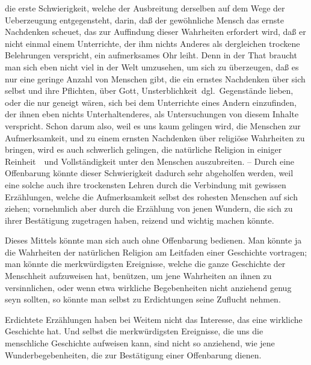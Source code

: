 \begin{aufza}
\item die erste Schwierigkeit, welche der Ausbreitung derselben auf dem Wege der Ueberzeugung entgegensteht, darin, daß der gewöhnliche Mensch das ernste Nachdenken scheuet, das zur Auffindung dieser Wahrheiten erfordert wird, daß er nicht einmal einem Unterrichte, der ihm nichts Anderes als dergleichen trockene Belehrungen verspricht, ein aufmerksames Ohr leiht. Denn in der That braucht man sich eben nicht viel in der Welt umzusehen, um sich zu überzeugen, daß es nur eine geringe Anzahl von Menschen gibt, die ein ernstes Nachdenken über sich selbst und ihre Pflichten, über Gott,  Unsterblichkeit \ua\,dgl.\ Gegenstände lieben, oder die nur geneigt wären, sich bei dem Unterrichte eines Andern einzufinden, der ihnen eben nichts Unterhaltenderes, als Untersuchungen von diesem Inhalte verspricht. Schon darum also, weil es uns kaum gelingen wird, die Menschen zur Aufmerksamkeit, und zu einem ernsten Nachdenken über religiöse Wahrheiten zu bringen, wird es auch schwerlich gelingen, die natürliche Religion in einiger Reinheit~\ und Vollständigkeit unter den Menschen auszubreiten. -- Durch eine Offenbarung könnte dieser Schwierigkeit dadurch sehr abgeholfen werden, weil eine solche auch ihre trockensten Lehren durch die Verbindung mit gewissen Erzählungen, welche die Aufmerksamkeit selbst des rohesten Menschen auf sich ziehen; vornehmlich aber durch die Erzählung von jenen Wundern, die sich zu ihrer Bestätigung zugetragen haben, reizend und wichtig machen könnte.
\item[\RWbet{Einwurf.}] Dieses Mittels könnte man sich auch ohne Offenbarung bedienen. Man könnte ja die Wahrheiten der natürlichen Religion am Leitfaden einer Geschichte vortragen; man könnte die merkwürdigsten Ereignisse, welche die ganze Geschichte der Menschheit aufzuweisen hat, benützen, um jene Wahrheiten an ihnen zu versinnlichen, oder wenn etwa wirkliche Begebenheiten nicht anziehend genug seyn sollten, so könnte man selbst zu Erdichtungen seine Zuflucht nehmen.
\item[\RWbet{Antwort.}] Erdichtete Erzählungen haben bei Weitem nicht das Interesse, das eine wirkliche Geschichte hat. Und selbst die merkwürdigsten Ereignisse, die uns die menschliche Geschichte aufweisen kann, sind nicht so anziehend, wie jene Wunderbegebenheiten, die zur Bestätigung einer Offenbarung dienen.

\end{aufza}
